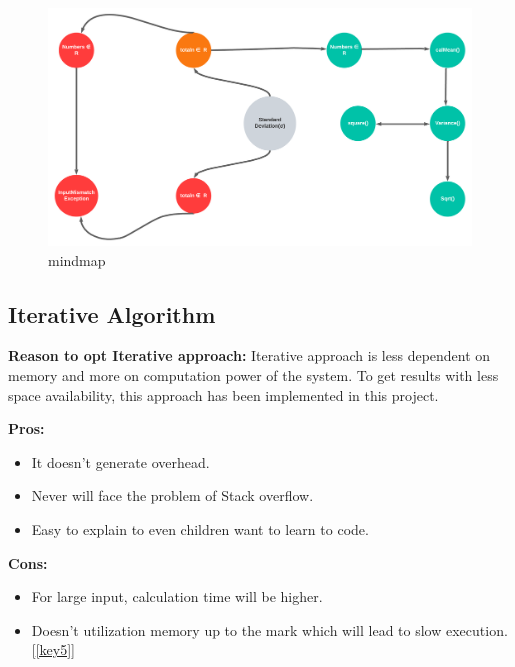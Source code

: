 \documentclass{scrartcl}
\begin{document}
\begin{figure}[H]
    \centering
    \includegraphics[width=1\textwidth]{Graphics/mindmap.png}
    \caption{mindmap}
    \label{fig:mindmap}
\end{figure}



\subsection{Iterative Algorithm}

\begin{spacing}{1.5}
\begin{Large}
\textbf{Reason to opt Iterative approach:} 
Iterative approach is less dependent on memory and more on computation power of the system. To get results with less space availability, this approach has been implemented in this project.
\end{Large}
\end{spacing}

\newpage

\begin{Large}
\vspace{0.8cm}
\textbf{Pros:}
\begin{itemize}
  \item It doesn't generate overhead.
  \item Never will face the problem of Stack overflow.
  \item Easy to explain to even children want to learn to code.
\end{itemize}
\end{Large}

\begin{Large}
\vspace{0.5cm}
\textbf{Cons:}
\begin{itemize}
  \item For large input, calculation time will be higher.
  \item Doesn't utilization memory up to the mark which will lead to slow execution.[\ref{key5}]
\end{itemize}
\end{Large}
\end{document}
